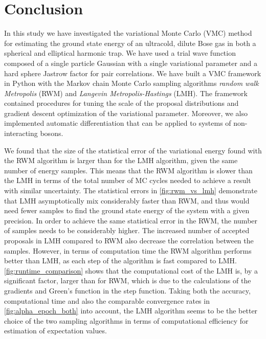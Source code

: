 \section{Conclusion}\label{sec:Conclusion}

In this study we have investigated the variational Monte Carlo (VMC) method for estimating the ground state energy of an ultracold, dilute Bose gas in both a spherical and elliptical harmonic trap. We have used a trial wave function composed of a single particle Gaussian with a single variational parameter and a hard sphere Jastrow factor for pair correlations. We have built a VMC framework in Python with the Markov chain Monte Carlo sampling algorithms \textit{random walk Metropolis} (RWM) and \textit{Langevin Metropolis-Hastings} (LMH). The framework contained procedures for tuning the scale of the proposal distributions and gradient descent optimization of the variational parameter. Moreover, we also implemented automatic differentiation that can be applied to systems of non-interacting bosons. 

We found that the size of the statistical error of the variational energy found with the RWM algorithm is larger than for the LMH algorithm, given the same number of energy samples. This means that the RWM algorithm is slower than the LMH in terms of the total number of MC cycles needed to achieve a result with similar uncertainty. The statistical errors in \autoref{fig:rwm_vs_lmh} demonstrate that LMH asymptotically mix considerably faster than RWM, and thus would need fewer samples to find the ground state energy of the system with a given precision. In order to achieve the same statistical error in the RWM, the number of samples needs to be considerably higher. The increased number of accepted proposals in LMH compared to RWM also decrease the correlation between the samples. However, in terms of computation time the RWM algorithm performs better than LMH, as each step of the algorithm is fast compared to LMH. \autoref{fig:runtime_comparison} shows that the computational cost of the LMH is, by a significant factor, larger than for RWM, which is due to the calculations of the gradients and Green's function in the step function. Taking both the accuracy, computational time and also the comparable convergence rates in \autoref{fig:alpha_epoch_both} into account, the LMH algorithm seems to be the better choice of the two sampling algorithms in terms of computational efficiency for estimation of expectation values. 

